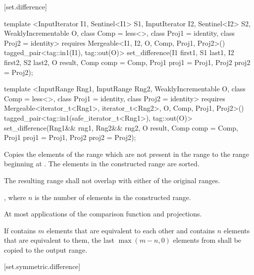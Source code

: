 [set.difference]{}

%
\begin{itemdecl}
template <InputIterator I1, Sentinel<I1> S1, InputIterator I2, Sentinel<I2> S2,
    WeaklyIncrementable O, class Comp = less<>, class Proj1 = identity, class Proj2 = identity>
  requires Mergeable<I1, I2, O, Comp, Proj1, Proj2>()
  tagged_pair<tag::in1(I1), tag::out(O)>
    set_difference(I1 first1, S1 last1, I2 first2, S2 last2, O result,
                   Comp comp = Comp{}, Proj1 proj1 = Proj1{}, Proj2 proj2 = Proj2{});

template <InputRange Rng1, InputRange Rng2, WeaklyIncrementable O,
    class Comp = less<>, class Proj1 = identity, class Proj2 = identity>
  requires Mergeable<iterator_t<Rng1>, iterator_t<Rng2>, O, Comp, Proj1, Proj2>()
  tagged_pair<tag::in1(safe_iterator_t<Rng1>), tag::out(O)>
    set_difference(Rng1&& rng1, Rng2&& rng2, O result,
                   Comp comp = Comp{}, Proj1 proj1 = Proj1{}, Proj2 proj2 = Proj2{});
\end{itemdecl}

\begin{itemdescr}
\pnum
\effects
Copies the elements of the range
which are not present in the range
to the range beginning at
.
The elements in the constructed range are sorted.

\pnum
\requires
The resulting range shall not overlap with either of the original ranges.

\pnum
\returns
{}, where $n$
is the number of elements in the constructed range.

\pnum
\complexity
At most
applications of the comparison function and projections.

\pnum
\notes
If
contains $m$
elements that are equivalent to each other and
contains $n$
elements that are equivalent to them, the last
$\max(m - n, 0)$
elements from
shall be copied to the output range.
\end{itemdescr}

[set.symmetric.difference]{}

